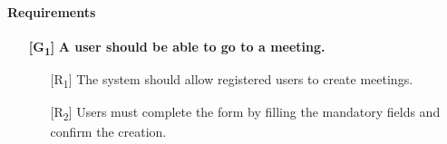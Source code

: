 \documentclass[12pt,titlepage]{article}
\begin{document}
\paragraph{Requirements}
\begin{itemize}



\item[\textbf{ {[G\textsubscript{1}]}}]	\textbf{	A user should be able to go to a meeting.}
\begin{itemize}
\item[{[R\textsubscript{1}]}] The system should allow registered users to create meetings.
\item[{[R\textsubscript{2}]}] Users must complete the form by filling the mandatory fields and confirm the creation.


\end{itemize}
\end{itemize}
\end{document}
